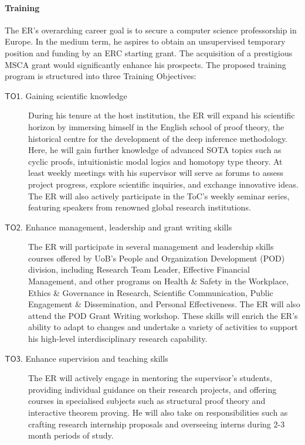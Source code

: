 \documentclass[11pt]{msca-pf}
\newcommand{\TO}[1]{$\mathsf{TO#1}$}
\begin{document}
\paragraph{Training}
The ER's overarching career goal is to secure a computer science professorship in Europe. In the
medium term, he aspires to obtain an unsupervised temporary position and funding by an ERC starting
grant. The acquisition of a prestigious MSCA grant would significantly enhance his prospects. The
proposed training program is structured into three Training Objectives:
\begin{description}
    \item[\TO{1}. Gaining scientific knowledge]
    During his tenure at the host institution, the ER will expand his scientific horizon by
    immersing himself in the English school of proof theory, the historical centre for the
    development of the deep inference methodology. Here, he will gain further knowledge of advanced
    SOTA topics such as cyclic proofs, intuitionistic modal logics and homotopy type
    theory. At least weekly meetings with his supervisor will serve as forums to assess project
    progress, explore scientific inquiries, and exchange innovative ideas. The ER will also actively
    participate in the ToC's weekly seminar series, featuring speakers from renowned global research
    institutions.

    \item[\TO{2}. Enhance management, leadership and grant writing skills]
    The ER will participate in several management and leadership skills courses offered by UoB's
    People and Organization Development (POD) division, including Research Team Leader, Effective
    Financial Management, and other programs on Health \& Safety in the Workplace, Ethics \&
    Governance in Research, Scientific Communication, Public Engagement \& Dissemination, and
    Personal Effectiveness. The ER will also attend the POD Grant Writing workshop. These skills
    will enrich the ER's ability to adapt to changes and undertake a variety of activities to
    support his high-level interdisciplinary research capability.

    \item[\TO{3}. Enhance supervision and teaching skills]
    The ER will actively engage in mentoring the supervisor's students, providing individual
    guidance on their research projects, and offering courses in specialised subjects such as
    structural proof theory and interactive theorem proving. He will also take on responsibilities
    such as crafting research internship proposals and overseeing interns during 2-3 month periods
    of study.

\end{description}
\end{document}
